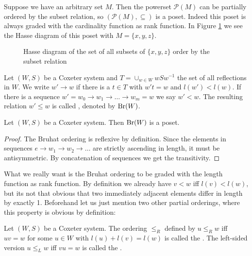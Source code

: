 \begin{exam}
	Suppose we have an arbitrary set $M$. Then the powerset $\mathcal P (M)$ can be partially ordered by the subset relation, so $(\mathcal P (M), \subseteq)$ is a poset. Indeed this poset is always graded with the cardinality function as rank function. In Figure \ref{fig:poset-xyz-subsets} we see the Hasse diagram of this poset with $M = \{x,y,z\}$.

	\begin{figure}[ht]
		\centering
		
		\caption{Hasse diagram of the set of all subsets of $\{x,y,z\}$ order by the subset relation}
		\label{fig:poset-xyz-subsets}
	\end{figure}
\end{exam}

\begin{defi}
	Let $(W,S)$ be a Coxeter system and $T = \cup_{w \in W} wSw^{-1}$ the set of all reflections in $W$. We write $w' \to w$ if there is a $t \in T$ with $w't = w$ and $l(w') < l(w)$. If there is a sequence $w' = w_0 \to w_1 \to \ldots \to w_m = w$ we say $w' < w$. The resulting relation $w' \leq w$ is called , denoted by $\operatorname{Br}(W)$.
\end{defi}

\begin{lemm}
	Let $(W,S)$ be a Coxeter system. Then $\operatorname{Br}(W)$ is a poset.

	\begin{proof}
		The Bruhat ordering is reflexive by definition. Since the elements in sequences $e \to w_1 \to w_2 \to \ldots$ are strictly ascending in length, it must be antisymmetric. By concatenation of sequences we get the transitivity.
	\end{proof}
\end{lemm}

What we really want is the Bruhat ordering to be graded with the length function as rank function. By definition we already have $v < w$ iff $l(v) < l(w)$, but its not that obvious that two immediately adjacent elements differ in length by exactly 1. Beforehand let us just mention two other partial orderings, where this property is obvious by definition:

\begin{defi}
	Let $(W,S)$ be a Coxeter system. The ordering $\leq_R$ defined by $u \leq_R w$ iff $uv = w$ for some $u \in W$ with $l(u) + l(v) = l(w)$ is called the . The left-sided version $u \leq_L w$ iff $vu = w$ is called the .
\end{defi}

